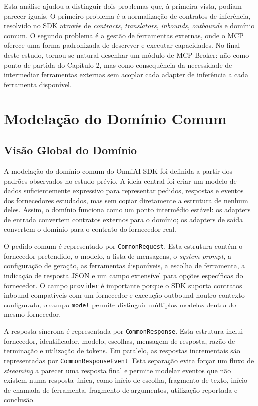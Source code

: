\documentclass[11pt,a4paper]{report}
\begin{document}
    Esta análise ajudou a distinguir dois problemas que, à primeira vista, podiam parecer iguais. O primeiro problema é a normalização de contratos de inferência, resolvido no SDK através de \textit{contracts}, \textit{translators}, \textit{inbounds}, \textit{outbounds} e domínio comum. O segundo problema é a gestão de ferramentas externas, onde o MCP oferece uma forma padronizada de descrever e executar capacidades. No final deste estudo, tornou-se natural desenhar um módulo de MCP Broker: não como ponto de partida do Capítulo 2, mas como consequência da necessidade de intermediar ferramentas externas sem acoplar cada adapter de inferência a cada ferramenta disponível.

    \chapter{Modelação do Domínio Comum}

    \section{Visão Global do Domínio}
    A modelação do domínio comum do OmniAI SDK foi definida a partir dos padrões observados no estudo prévio. A ideia central foi criar um modelo de dados suficientemente expressivo para representar pedidos, respostas e eventos dos fornecedores estudados, mas sem copiar diretamente a estrutura de nenhum deles. Assim, o domínio funciona como um ponto intermédio estável: os adapters de entrada convertem contratos externos para o domínio; os adapters de saída convertem o domínio para o contrato do fornecedor real.

    O pedido comum é representado por \texttt{CommonRequest}. Esta estrutura contém o fornecedor pretendido, o modelo, a lista de mensagens, o \textit{system prompt}, a configuração de geração, as ferramentas disponíveis, a escolha de ferramenta, a indicação de resposta JSON e um campo extensível para opções específicas do fornecedor. O campo \texttt{provider} é importante porque o SDK suporta contratos inbound compatíveis com um fornecedor e execução outbound noutro contexto configurado; o campo \texttt{model} permite distinguir múltiplos modelos dentro do mesmo fornecedor.

    A resposta síncrona é representada por \texttt{CommonResponse}. Esta estrutura inclui fornecedor, identificador, modelo, escolhas, mensagem de resposta, razão de terminação e utilização de tokens. Em paralelo, as respostas incrementais são representadas por \texttt{CommonResponseEvent}. Esta separação evita forçar um fluxo de \textit{streaming} a parecer uma resposta final e permite modelar eventos que não existem numa resposta única, como início de escolha, fragmento de texto, início de chamada de ferramenta, fragmento de argumentos, utilização reportada e conclusão.
\end{document}
